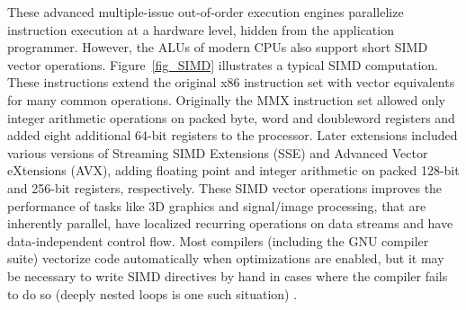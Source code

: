 These advanced multiple-issue out-of-order execution engines parallelize instruction execution at a hardware level, hidden from the application programmer. However, the ALUs of modern CPUs also support short 
SIMD vector operations. Figure~\ref{fig_SIMD} illustrates a typical SIMD computation. These instructions extend the original x86 instruction set with vector equivalents for many common operations. Originally
the MMX instruction set allowed only integer arithmetic operations on packed byte, word and doubleword registers and added eight additional 64-bit registers to the processor. Later extensions included 
various versions of Streaming SIMD Extensions (SSE) and Advanced Vector eXtensions (AVX), adding floating point and integer arithmetic on packed 128-bit and 256-bit registers, respectively. These
SIMD vector operations improves the performance of tasks like 3D graphics and signal/image processing, that are inherently parallel, have localized recurring operations on data streams and have data-independent 
control flow. Most compilers (including the GNU compiler suite) vectorize code automatically when optimizations are enabled, but it may be necessary to write SIMD directives by hand in cases where the compiler fails
to do so (deeply nested loops is one such situation) \cite{intelArch}.
